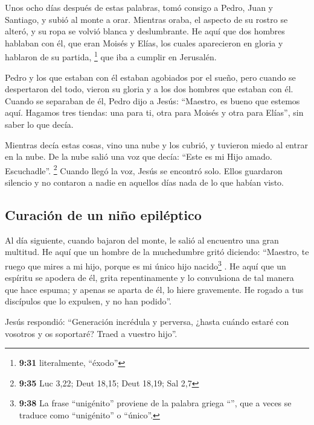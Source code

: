  Unos ocho días después de estas palabras, tomó consigo a
Pedro, Juan y Santiago, y subió al monte a orar. 
Mientras oraba, el aspecto de su rostro se alteró, y su ropa se volvió
blanca y deslumbrante.  He aquí que dos hombres hablaban
con él, que eran Moisés y Elías,  los cuales aparecieron
en gloria y hablaron de su partida, \footnote{\textbf{9:31}
  literalmente, ``éxodo''} que iba a cumplir en Jerusalén.

 Pedro y los que estaban con él estaban agobiados por el
sueño, pero cuando se despertaron del todo, vieron su gloria y a los dos
hombres que estaban con él.  Cuando se separaban de él,
Pedro dijo a Jesús: ``Maestro, es bueno que estemos aquí. Hagamos tres
tiendas: una para ti, otra para Moisés y otra para Elías'', sin saber lo
que decía.

 Mientras decía estas cosas, vino una nube y los cubrió,
y tuvieron miedo al entrar en la nube.  De la nube salió
una voz que decía: ``Este es mi Hijo amado. Escuchadle''. \footnote{\textbf{9:35}
  Luc 3,22; Deut 18,15; Deut 18,19; Sal 2,7}  Cuando
llegó la voz, Jesús se encontró solo. Ellos guardaron silencio y no
contaron a nadie en aquellos días nada de lo que habían visto.

\hypertarget{curaciuxf3n-de-un-niuxf1o-epiluxe9ptico}{%
\subsection{Curación de un niño
epiléptico}\label{curaciuxf3n-de-un-niuxf1o-epiluxe9ptico}}

 Al día siguiente, cuando bajaron del monte, le salió al
encuentro una gran multitud.  He aquí que un hombre de la
muchedumbre gritó diciendo: ``Maestro, te ruego que mires a mi hijo,
porque es mi único hijo nacido\footnote{\textbf{9:38} La frase
  ``unigénito'' proviene de la palabra griega ``'', que
  a veces se traduce como ``unigénito'' o ``único''.} . 
He aquí que un espíritu se apodera de él, grita repentinamente y lo
convulsiona de tal manera que hace espuma; y apenas se aparta de él, lo
hiere gravemente.  He rogado a tus discípulos que lo
expulsen, y no han podido''.

 Jesús respondió: ``Generación incrédula y perversa,
¿hasta cuándo estaré con vosotros y os soportaré? Traed a vuestro
hijo''.

